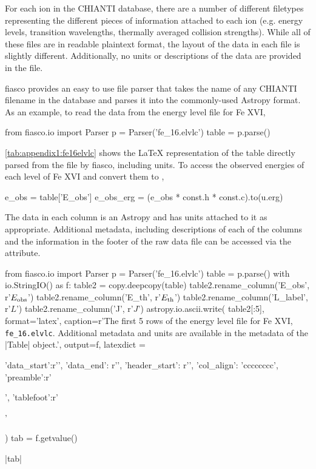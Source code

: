 For each ion in the CHIANTI database, there are a number of different filetypes representing the different pieces of information attached to each ion (e.g. energy levels, transition wavelengths, thermally averaged collision strengths). While all of these files are in readable plaintext format, the layout of the data in each file is slightly different. Additionally, no units or descriptions of the data are provided in the file.

fiasco provides an easy to use file parser that takes the name of any CHIANTI filename in the database and parses it into the commonly-used Astropy  format. As an example, to read the data from the energy level file for Fe XVI,
\begin{pyverbatim}[appendix1][baselinestretch=1,xleftmargin=3em]
from fiasco.io import Parser
p = Parser('fe_16.elvlc')
table = p.parse()
\end{pyverbatim}
\autoref{tab:appendix1:fe16elvlc} shows the \LaTeX{} representation of the table directly parsed from the file by fiasco, including units. To access the observed energies of each level of Fe XVI and convert them to \si{\erg},
\begin{pyverbatim}[appendix1][baselinestretch=1,xleftmargin=3em]
e_obs = table['E_obs']
e_obs_erg = (e_obs * const.h * const.c).to(u.erg)
\end{pyverbatim}
The data in each column is an Astropy  and has units attached to it as appropriate. Additional metadata, including descriptions of each of the columns and the information in the footer of the raw data file can be accessed via the  attribute.

\begin{pycode}[appendix1]
from fiasco.io import Parser
p = Parser('fe_16.elvlc')
table = p.parse()
with io.StringIO() as f:
    table2 = copy.deepcopy(table)
    table2.rename_column('E_obs', r'$E_\textup{obs}$')
    table2.rename_column('E_th', r'$E_\textup{th}$')
    table2.rename_column('L_label', r'$L$')
    table2.rename_column('J', r'$J$')
    astropy.io.ascii.write(
        table2[:5],
        format='latex',
        caption=r'The first 5 rows of the energy level file for Fe XVI, \texttt{fe\_16.elvlc}. Additional metadata and units are available in the metadata of the \pyv|Table| object.\label{tab:appendix1:fe16elvlc}',
        output=f,
        latexdict = { 'data_start':r'\midrule', 'data_end': r'\bottomrule',
                      'header_start': r'\toprule', 'col_align': 'cccccccc',
                      'preamble':r'\begin{center}', 'tablefoot':r'\end{center}'
                    }
    )
    tab = f.getvalue()
\end{pycode}
\py[appendix1]|tab|

